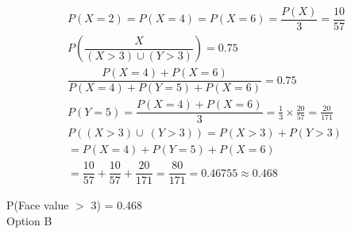 \documentclass[journal,12pt,twocolumn]{IEEEtran}
\begin{document}
\begin{align}
    P(X = 2) = P(X = 4) = P(X = 6) = \dfrac{P(X)}{3} =     \dfrac{10}{57}\\
    P\left(\dfrac{X}{(X > 3)\cup (Y > 3)}\right) = 0.75\\
    \dfrac{P(X = 4) + P(X = 6)}{P(X = 4) + P(Y = 5) + P(X = 6)} =     0.75\\[5pt]
    P(Y = 5) = \dfrac {P(X = 4) + P(X = 6)}{3}
    = \frac{1}{3}\times\frac{20}{57} = \frac{20}{171}\\
    P((X > 3) \cup\ (Y > 3)) = P(X > 3) + P(Y > 3)\\
    = P(X = 4) + P(Y = 5) + P(X = 6)\\
    = \dfrac{10}{57} + \dfrac{10}{57} + \dfrac{20}{171} =     \dfrac{80}{171} = 0.46755 \approx 0.468
\end{align}

\centering
\Large P(Face value $>$ 3) = 0.468\\[5pt]
Option B
\end{document}
